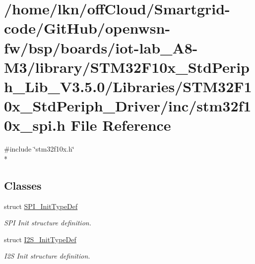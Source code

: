 \hypertarget{iot-lab___a8-_m3_2library_2_s_t_m32_f10x___std_periph___lib___v3_85_80_2_libraries_2_s_t_m32_f10f61c29a044ae905ab4a9b0c3d37c73a1}{}\section{/home/lkn/off\+Cloud/\+Smartgrid-\/code/\+Git\+Hub/openwsn-\/fw/bsp/boards/iot-\/lab\+\_\+\+A8-\/\+M3/library/\+S\+T\+M32\+F10x\+\_\+\+Std\+Periph\+\_\+\+Lib\+\_\+\+V3.5.0/\+Libraries/\+S\+T\+M32\+F10x\+\_\+\+Std\+Periph\+\_\+\+Driver/inc/stm32f10x\+\_\+spi.h File Reference}
\label{iot-lab___a8-_m3_2library_2_s_t_m32_f10x___std_periph___lib___v3_85_80_2_libraries_2_s_t_m32_f10f61c29a044ae905ab4a9b0c3d37c73a1}
{\ttfamily \#include \char`\"{}stm32f10x.\+h\char`\"{}}\\*
\subsection*{Classes}
\begin{DoxyCompactItemize}
\item 
struct \hyperlink{struct_s_p_i___init_type_def}{S\+P\+I\+\_\+\+Init\+Type\+Def}
\begin{DoxyCompactList}\small\item\em S\+PI Init structure definition. \end{DoxyCompactList}\item 
struct \hyperlink{struct_i2_s___init_type_def}{I2\+S\+\_\+\+Init\+Type\+Def}
\begin{DoxyCompactList}\small\item\em I2S Init structure definition. \end{DoxyCompactList}\end{DoxyCompactItemize}
